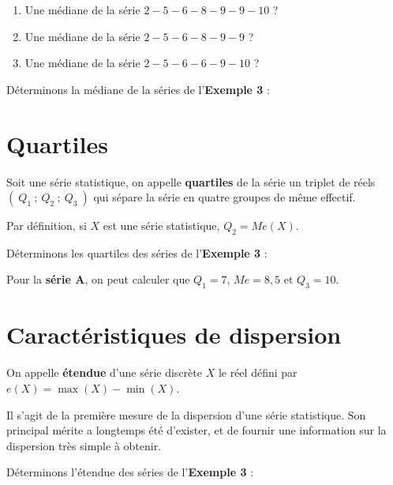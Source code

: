 \documentclass[a4paper,10pt]{report}
\begin{document}
\begin{ex}
   \begin{enumerate}
      \item Une médiane de la série \og $2-5-6-8-9-9-10$ \fg{} ?
      
      \noindent\grandscarreaux{\linewidth}{1.4cm} 
      \item Une médiane de la série \og $2-5-6-8-9-9$ \fg{} ?
      
      \noindent\grandscarreaux{\linewidth}{1.4cm} 
      \item Une médiane de la série \og $2-5-6-6-9-10$ \fg{} ?
      
      \noindent\grandscarreaux{\linewidth}{1.4cm} 
   \end{enumerate}
\end{ex}

\begin{ex}
Déterminons la médiane de la séries de l'\textbf{Exemple 3} :

\noindent\grandscarreaux{\linewidth}{4cm} 
\end{ex}

\section{Quartiles}

\begin{defn}
   Soit une série statistique, on appelle \textbf{quartiles} de la série un triplet de réels $(~Q_1~;~Q_2~;~Q_3~)$ qui sépare la série en quatre groupes de même effectif.
\end{defn}
\medskip

\begin{rem}
Par définition, si $X$ est une série statistique, $Q_2 =Me(X)$.
\end{rem}

\begin{ex}
Déterminons les quartiles des séries de l'\textbf{Exemple 3} :

\noindent\grandscarreaux{\linewidth}{4cm} 
\end{ex}


\begin{ex}
Pour la \textbf{série A}, on peut calculer que $Q_1=7$, $Me=8,5$ et $Q_3=10$.  
\end{ex}

\section{Caractéristiques de dispersion}

\begin{defn}
On appelle \textbf{étendue} d'une série discrète $X$ le réel défini par $e(X)=\max(X)-\min(X)$.
\end{defn}
\medskip

Il s'agit de la première mesure de la dispersion d'une série statistique. Son principal mérite a longtemps été d'exister, et de fournir une information sur la dispersion très simple à obtenir.

\begin{ex}
Déterminons l'étendue des séries de l'\textbf{Exemple 3} :

\noindent\grandscarreaux{\linewidth}{2cm} 
\end{ex}
\end{document}
